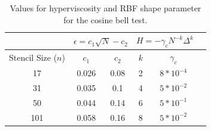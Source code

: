 \begin{table}[ht!]
\caption{Values for hyperviscosity and RBF shape parameter for the cosine bell test. }
\begin{center}
\begin{tabular}{|c|c|c|c|c|c|}
\hline		     & \multicolumn{2}{c|}{$\epsilon = c_1 \sqrt{N} - c_2$} & \multicolumn{2}{c|}{$H = -\gamma_{c} N^{-k} \Delta^{k}$ } \\ \hline
Stencil Size ($n$) & $c_{1}$ & $c_{2}$ & $k$ & $\gamma_c$ \\ \hline
17 & 0.026 & 0.08 & 2 & $8 * 10^{-4}$ \\
31 & 0.035 & 0.1 & 4 & $5 * 10^{-2}$ \\
50 & 0.044 & 0.14 & 6 & $5 * 10^{-1}$ \\
101 & 0.058 & 0.16 & 8 & $5 * 10^{-2}$ \\ \hline
\end{tabular}
\end{center}
\label{tbl:cos_hv_params}
\end{table}

